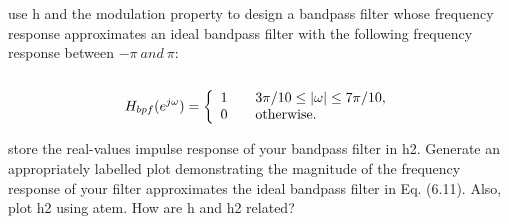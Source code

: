 use h and the modulation property to design a bandpass filter whose frequency response approximates an ideal bandpass filter with the following frequency response between $-\pi\ and\ \pi$:\\
\\
\[ H_{bpf}(e^{j \omega}) = \left\{
  \begin{array}{l l}
    1 & \quad \text{$3\pi/10 \le |\omega| \le 7\pi/10$,} \\
    0 & \quad \text{otherwise.}
  \end{array} \right.\]

store the real-values impulse response of your bandpass filter in h2. Generate an appropriately labelled plot demonstrating the magnitude of the frequency response of your filter approximates the ideal bandpass filter in Eq. (6.11). Also, plot h2 using atem. How are h and h2 related?\\
